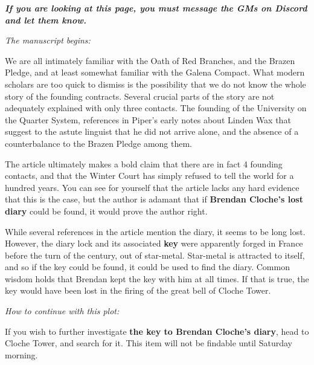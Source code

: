 \documentclass[green]{gl2018}
\begin{document}
\name{\gYanoraManuscript{}}



\emph{{\bf If you are looking at this page, you must message the GMs on Discord and let them know.}}

\emph{The manuscript begins:}
\begin{changemargin}{3cm}{3cm}
We are all intimately familiar with the Oath of Red Branches, and the Brazen Pledge, and at least somewhat familiar with the Galena Compact. What modern scholars are too quick to dismiss is the possibility that we do not know the whole story of the founding contracts. Several crucial parts of the story are not adequately explained with only three contacts. The founding of the University on the Quarter System, references in Piper's early notes about Linden Wax that suggest to the astute linguist that he did not arrive alone, and the absence of a counterbalance to the Brazen Pledge among them.
\end{changemargin}

The article ultimately makes a bold claim that there are in fact 4 founding contacts, and that the Winter Court has simply refused to tell the world for a hundred years. You can see for yourself that the article lacks any hard evidence that this is the case, but the author is adamant that if {\bf Brendan Cloche’s lost diary} could be found, it would prove the author right.

While several references in the article mention the diary, it seems to be long lost. However, the diary lock and its associated {\bf key} were apparently forged in France before the turn of the century, out of star-metal. Star-metal is attracted to itself, and so if the key could be found, it could be used to find the diary. Common wisdom holds that Brendan kept the key with him at all times. If that is true, the key would have been lost in the firing of the great bell of Cloche Tower.

\vspace{25px}
\emph{How to continue with this plot:}
\begin{changemargin}{3cm}{3cm}
If you wish to further investigate {\bf the key to Brendan Cloche’s diary}, head to Cloche Tower, and search for it. This item will not be findable until Saturday morning.
\end{changemargin}
\end{document}

